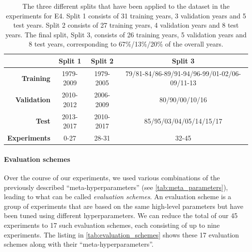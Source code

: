 \begin{table}[h!]
  \centering
  \begin{tabular}{rccc}
    \toprule
    & \textbf{Split 1} & \textbf{Split 2} & \textbf{Split 3} \\
    \midrule
    \textbf{Training} & 1979-2009 & 1979-2005 & 79/81-84/86-89/91-94/96-99/01-02/06-09/11-13 \\
    \textbf{Validation} & 2010-2012 & 2006-2009 & 80/90/00/10/16 \\
    \textbf{Test} & 2013-2017 & 2010-2017 & 85/95/03/04/05/14/15/17 \\
    \midrule
    \textbf{Experiments} & 0-27 & 28-31 & 32-45 \\
    \bottomrule
  \end{tabular}
  \caption{The three different splits that have been applied to the dataset in the experiments for E4. Split 1 consists of 31 training years, 3 validation years and 5 test years. Split 2 consists of 27 training years, 4 validation years and 8 test years. The final split, Split 3, consists of 26 training years, 5 validation years and 8 test years, corresponding to 67\%/13\%/20\% of the overall years.}
  \label{tab:train_test_split}
\end{table}

\paragraph{Evaluation schemes}
Over the course of our experiments, we used various combinations of the previously described ``meta-hyperparameters'' (see \cref{tab:meta_parameters}), leading to what can be called \textit{evaluation schemes}. An evaluation scheme is a group of experiments that are based on the same high-level parameters but have been tuned using different hyperparameters. We can reduce the total of our 45 experiments to 17 such evaluation schemes, each consisting of up to nine experiments. The listing in \cref{tab:evaluation_schemes} shows these 17 evaluation schemes along with their ``meta-hyperparameters''.

